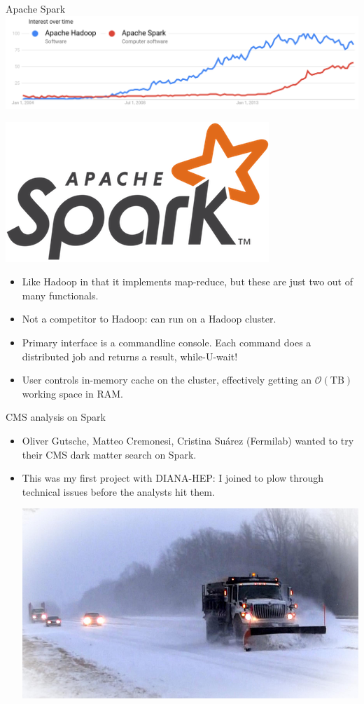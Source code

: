\documentclass{beamer}
\begin{document}
\begin{frame}{Apache Spark}
\vspace{0.5 cm}
\includegraphics[width=\linewidth]{hadoop-versus-spark.png}

\vfill
\includegraphics[width=0.25\linewidth]{spark.png}

\begin{itemize}
\item Like Hadoop in that it implements map-reduce, but these are just two out of many functionals.
\item<2-> Not a competitor to Hadoop: can run on a Hadoop cluster.
\item<3-> Primary interface is a commandline console. Each command does a distributed job and returns a result, while-U-wait\texttrademark!
\item<4-> User controls in-memory cache on the cluster, effectively getting an $\mathcal{O}(\mbox{TB})$ working space in RAM.
\end{itemize}
\end{frame}

\begin{frame}{CMS analysis on Spark}
\vfill
\begin{itemize}
\item Oliver Gutsche, Matteo Cremonesi, Cristina Su\'arez (Fermilab) wanted to try their CMS dark matter search on Spark.
\item This was my first project with DIANA-HEP: I joined to plow through technical issues before the analysts hit them.

\vfill
\begin{center}
\includegraphics[width=0.75\linewidth]{snowplow.jpg}
\end{center}
\end{itemize}
\end{frame}
\end{document}
